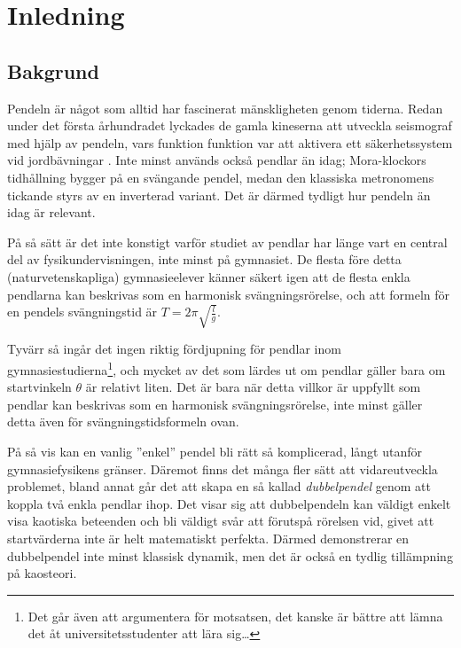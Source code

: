 \chapter*{Inledning}

\section{Bakgrund}
Pendeln är något som alltid har fascinerat mänskligheten genom tiderna. Redan under det första århundradet lyckades de gamla kineserna att utveckla seismograf med hjälp av pendeln, vars funktion funktion var att aktivera ett säkerhetssystem vid jordbävningar \cite{book:china_history}. Inte minst används också pendlar än idag; Mora-klockors tidhållning bygger på en svängande pendel, medan den klassiska metronomens tickande styrs av en inverterad variant. Det är därmed tydligt hur pendeln än idag är relevant.

På så sätt är det inte konstigt varför studiet av pendlar har länge vart en central del av fysikundervisningen, inte minst på gymnasiet. De flesta före detta (naturvetenskapliga) gymnasieelever känner säkert igen att de flesta enkla pendlarna kan beskrivas som en harmonisk svängningsrörelse, och att formeln för en pendels svängningstid är $T = 2\pi\sqrt{\frac{l}{g}}$. 

Tyvärr så ingår det ingen riktig fördjupning för pendlar inom gymnasiestudierna\footnote{Det går även att argumentera för motsatsen, det kanske är bättre att lämna det åt universitetsstudenter att lära sig\dots}, och mycket av det som lärdes ut om pendlar gäller bara om startvinkeln $\theta$ är relativt liten. Det är bara när detta villkor är uppfyllt som pendlar kan beskrivas som en harmonisk svängningsrörelse, inte minst gäller detta även för svängningstidsformeln ovan.

På så vis kan en vanlig ''enkel'' pendel bli rätt så komplicerad, långt utanför gymnasiefysikens gränser. Däremot finns det många fler sätt att vidareutveckla problemet, bland annat går det att skapa en så kallad \emph{dubbelpendel} genom att koppla två enkla pendlar ihop. Det visar sig att dubbelpendeln kan väldigt enkelt visa kaotiska beteenden och bli väldigt svår att förutspå rörelsen vid, givet att startvärderna inte är helt matematiskt perfekta. Därmed demonstrerar en dubbelpendel inte minst klassisk dynamik, men det är också en tydlig tillämpning på kaosteori.


